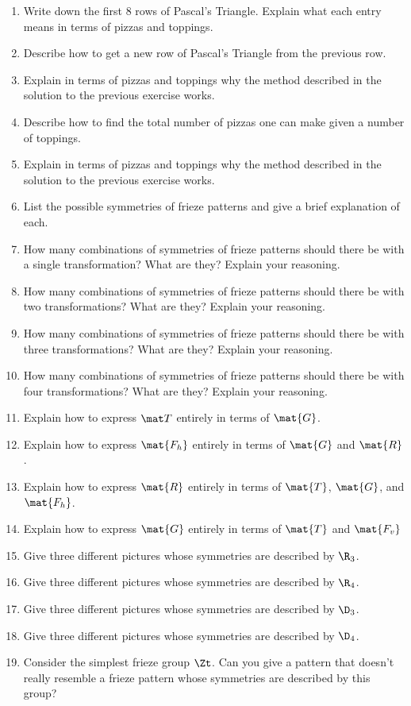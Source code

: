 \begin{enumerate}
\item Write down the first $8$ rows of Pascal's Triangle. Explain what
  each entry means in terms of pizzas and toppings.
\item Describe how to get a new row of Pascal's Triangle from the
  previous row. 
\item Explain in terms of pizzas and toppings why the method described
  in the solution to the previous exercise works.
\item Describe how to find the total number of pizzas one can make
  given a number of toppings.
\item Explain in terms of pizzas and toppings why the method described
  in the solution to the previous exercise works.
\item List the possible symmetries of frieze patterns and give a brief
  explanation of each.
\item How many combinations of symmetries of frieze patterns should
  there be with a single transformation?  What are they? Explain your reasoning.
\item How many combinations of symmetries of frieze patterns should
  there be with two transformations?  What are they? Explain your
  reasoning.
\item How many combinations of symmetries of frieze patterns should
  there be with three transformations?  What are they? Explain your
  reasoning.
\item How many combinations of symmetries of frieze patterns should
  there be with four transformations?  What are they? Explain your
  reasoning.
\item Explain how to express $\mat T$ entirely in terms of $\mat{G}$.
\item Explain how to express $\mat{F_h}$ entirely in terms of
  $\mat{G}$ and $\mat{R}$.
\item Explain how to express $\mat{R}$ entirely in terms of $\mat{T}$,
  $\mat{G}$, and $\mat{F_h}$.
\item Explain how to express $\mat{G}$ entirely in terms of $\mat{T}$
  and $\mat{F_v}$
\item Give three different pictures whose symmetries are described by
  $\R_3$.
\item Give three different pictures whose symmetries are described by
  $\R_4$.
\item Give three different pictures whose symmetries are described by
  $\D_3$.
\item Give three different pictures whose symmetries are described by
  $\D_4$.
\item Consider the simplest frieze group $\Zt$. Can you give a
  pattern that doesn't really resemble a frieze pattern whose
  symmetries are described by this group?
\end{enumerate}

